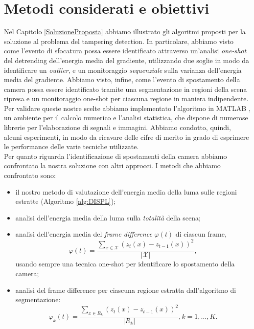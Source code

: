 \section{Metodi considerati e obiettivi}
\label{obiettivi}
Nel Capitolo \ref{SoluzioneProposta} abbiamo illustrato gli algoritmi proposti per la soluzione al problema del tampering detection.
In particolare, abbiamo visto come l'evento di sfocatura possa essere identificato attraverso un'analisi \textit{one-shot} del detrending dell'energia media del gradiente, utilizzando due soglie in modo da identificare un \textit{outlier}, e un monitoraggio \textit{sequenziale} sulla varianza dell'energia media del gradiente.
Abbiamo visto, infine, come l'evento di spostamento della camera possa essere identificato tramite una segmentazione in regioni della scena ripresa e un monitoraggio one-shot per ciascuna regione in maniera indipendente.\\
Per validare queste nostre scelte abbiamo implementato l'algoritmo in MATLAB \cite{matlab}, un ambiente per il calcolo numerico e l'analisi statistica, che dispone di numerose librerie per l'elaborazione di segnali e immagini.
Abbiamo condotto, quindi, alcuni esperimenti, in modo da ricavare delle cifre di merito in grado di esprimere le performance delle varie tecniche utilizzate.\\
Per quanto riguarda l'identificazione di spostamenti della camera abbiamo confrontato la nostra soluzione con altri approcci.
I metodi che abbiamo confrontato sono:
\begin{itemize}
	\item il nostro metodo di valutazione dell'energia media della luma sulle regioni estratte (Algoritmo \ref{alg:DISPL});
	\item analisi dell'energia media della luma sulla \textit{totalit\`a} della scena;
	\item analisi dell'energia media del \textit{frame difference} $\varphi(t)$ di ciascun frame, 
	\begin{equation}
	\label{eq:frameDiff}
	\varphi(t) = \frac{\sum_{x \in \mathcal{X}}(z_t(x) - z_{t-1}(x))^2}{|\mathcal{X}|},
	\end{equation}
	usando sempre una tecnica one-shot per identificare lo spostamento della camera;
	\item analisi del frame difference per ciascuna regione estratta dall'algoritmo di segmentazione:
	\begin{equation}
	\label{eq:frameDiffReg}
	\varphi_k(t) = \frac{\sum_{x \in R_k}(z_t(x) - z_{t-1}(x))^2}{|R_k|}, k=1,\dots,K.
	\end{equation}
\end{itemize}
